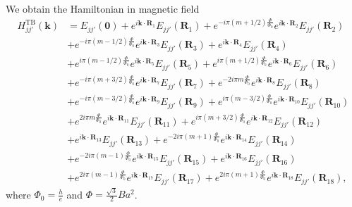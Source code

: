 \documentclass{article}
\begin{document}
We obtain the Hamiltonian in magnetic field
\begin{equation}
	\begin{aligned}
		H_{jj'}^{\text{TB}}(\mathbf{k})
		 & = E_{jj'}(\mathbf{0}) + e^{i \mathbf{k} \cdot \mathbf{R}_{1}} E_{jj'}(\mathbf{R}_{1})
		+ e^{-i\pi(m + 1/2)\tfrac{\Phi}{\Phi_{0}}} e^{i \mathbf{k} \cdot \mathbf{R}_{2}} E_{jj'}(\mathbf{R}_{2})      \\
		 & + e^{-i\pi(m - 1/2)\tfrac{\Phi}{\Phi_{0}}} e^{i \mathbf{k} \cdot \mathbf{R}_{3}} E_{jj'}(\mathbf{R}_{3})
		+ e^{i \mathbf{k} \cdot \mathbf{R}_{4}} E_{jj'}(\mathbf{R}_{4})                                               \\
		 & + e^{i\pi(m - 1/2)\tfrac{\Phi}{\Phi_{0}}} e^{i \mathbf{k} \cdot \mathbf{R}_{5}} E_{jj'}(\mathbf{R}_{5})
		+ e^{i\pi(m + 1/2)\tfrac{\Phi}{\Phi_{0}}} e^{i \mathbf{k} \cdot \mathbf{R}_{6}} E_{jj'}(\mathbf{R}_{6})       \\
		 & + e^{- i\pi(m + 3/2)\tfrac{\Phi}{\Phi_{0}} } e^{i \mathbf{k} \cdot \mathbf{R}_{7}} E_{jj'}(\mathbf{R}_{7})
		+ e^{- 2i\pi m\tfrac{\Phi}{\Phi_{0}} } e^{i \mathbf{k} \cdot \mathbf{R}_{8}} E_{jj'}(\mathbf{R}_{8})          \\
		 & + e^{- i\pi(m - 3/2)\tfrac{\Phi}{\Phi_{0}} } e^{i \mathbf{k} \cdot \mathbf{R}_{9}} E_{jj'}(\mathbf{R}_{9})
		+ e^{ i\pi (m-3/2)\tfrac{\Phi}{\Phi_{0}} } e^{i \mathbf{k} \cdot \mathbf{R}_{10}} E_{jj'}(\mathbf{R}_{10})    \\
		 & + e^{2 i\pi m \tfrac{\Phi}{\Phi_{0}} } e^{i \mathbf{k} \cdot \mathbf{R}_{11}} E_{jj'}(\mathbf{R}_{11})
		+ e^{ i\pi (m+3/2)\tfrac{\Phi}{\Phi_{0}} } e^{i \mathbf{k} \cdot \mathbf{R}_{12}} E_{jj'}(\mathbf{R}_{12})    \\
		 & + e^{i \mathbf{k} \cdot \mathbf{R}_{13}} E_{jj'}(\mathbf{R}_{13})
		+ e^{-2i\pi(m + 1)\tfrac{\Phi}{\Phi_{0}}} e^{i \mathbf{k} \cdot \mathbf{R}_{14}} E_{jj'}(\mathbf{R}_{14})     \\
		 & + e^{-2i\pi(m - 1)\tfrac{\Phi}{\Phi_{0}}} e^{i \mathbf{k} \cdot \mathbf{R}_{15}} E_{jj'}(\mathbf{R}_{15})
		+ e^{i \mathbf{k} \cdot \mathbf{R}_{16}} E_{jj'}(\mathbf{R}_{16})                                             \\
		 & + e^{2i\pi(m - 1)\tfrac{\Phi}{\Phi_{0}}} e^{i \mathbf{k} \cdot \mathbf{R}_{17}} E_{jj'}(\mathbf{R}_{17})
		+ e^{2i\pi(m + 1)\tfrac{\Phi}{\Phi_{0}}} e^{i \mathbf{k} \cdot \mathbf{R}_{18}} E_{jj'}(\mathbf{R}_{18}),
	\end{aligned}
\end{equation}
where $\Phi_{0} = \frac{h}{e}$ and $\Phi = \frac{\sqrt{3}}{2} Ba^{2}$.
\end{document}
